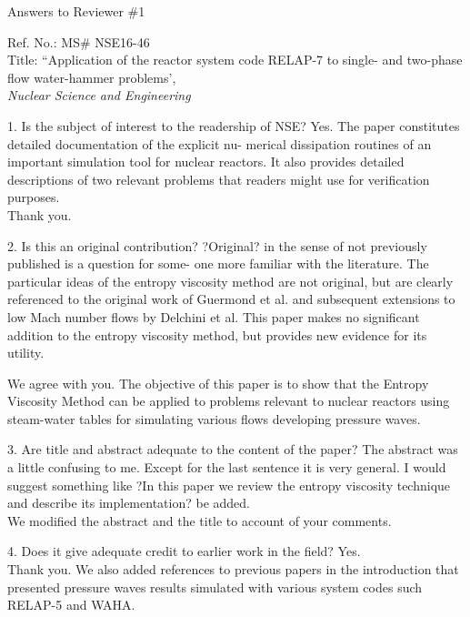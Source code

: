 \documentclass{article}
\begin{document}
\begin{center}
{ \Large Answers to Reviewer \#1}
\end{center}

\bigskip

\noindent Ref. No.: MS\# NSE16-46\\
Title: ``Application of the reactor system code RELAP-7 to single- and two-phase flow water-hammer problems', \\
{\it Nuclear Science and Engineering}\\

\bigskip
\bigskip

{\color{blue}
1. Is the subject of interest to the readership of NSE?
Yes. The paper constitutes detailed documentation of the explicit nu- merical dissipation routines of an important simulation tool for nuclear reactors. It also provides detailed descriptions of two relevant problems that readers might use for verification purposes. \\
}
Thank you.

\bigskip

{\color{blue}
2. Is this an original contribution?
?Original? in the sense of not previously published is a question for some- one more familiar with the literature.
The particular ideas of the entropy viscosity method are not original, but are clearly referenced to the original work of Guermond et al. and subsequent extensions to low Mach number flows by Delchini et al. This paper makes no significant addition to the entropy viscosity method, but provides new evidence for its utility. \\
}

We agree with you. The objective of this paper is to show that the Entropy Viscosity Method can be applied to problems relevant to nuclear reactors using steam-water tables for simulating various flows developing pressure waves.

\bigskip

{\color{blue}
3. Are title and abstract adequate to the content of the paper?
The abstract was a little confusing to me. Except for the last sentence it is very general. I would suggest something like ?In this paper we review the entropy viscosity technique and describe its implementation? be added. \\
}
We modified the abstract and the title to account of your comments. 

\bigskip

{\color{blue}
4. Does it give adequate credit to earlier work in the field? Yes. \\
}
Thank you. We also added references to previous papers in the introduction that presented pressure waves results simulated with various system codes such RELAP-5 and WAHA.
\bigskip
\end{document}
